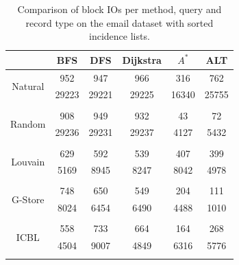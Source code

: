 \begin{table}[H]
	\begin{center}
		 \begin{tabular}[c]{c c c c c c} \toprule
			  & BFS & DFS & Dijkstra & $A^*$  & ALT \\ \midrule 
 			\multirow{2}{*}{Natural}  & 952 & 947 & 966 & 316 & 762 \\ 
 				 & 29223 & 29221 & 29225 & 16340 & 25755 \\ 
 				&&&&& \\[-0.5em]
 			\multirow{2}{*}{Random}  & 908 & 949 & 932 & 43 & 72 \\ 
 				 & 29236 & 29231 & 29237 & 4127 & 5432 \\ 
 				&&&&& \\[-0.5em]
 			\multirow{2}{*}{Louvain}  & 629 & 592 & 539 & 407 & 399 \\ 
 				 & 5169 & 8945 & 8247 & 8042 & 4978 \\ 
 				&&&&& \\[-0.5em]
 			\multirow{2}{*}{G-Store}  & 748 & 650 & 549 & 204 & 111 \\ 
 				 & 8024 & 6454 & 6490 & 4488 & 1010 \\ 
 				&&&&& \\[-0.5em]
 			\multirow{2}{*}{ICBL}  & 558 & 733 & 664 & 164 & 268 \\ 
 				 & 4504 & 9007 & 4849 & 6316 & 5776 \\ 
 				&&&&& \\[-0.5em]
 					\end{tabular}  
  	 \end{center}
	 \caption{Comparison of block IOs per method, query and record type on the email dataset with sorted incidence lists.}
	 \label{email-s}
\end{table}

